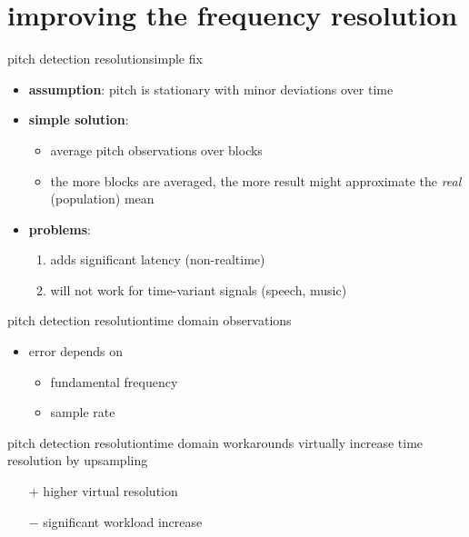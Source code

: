     \section[solutions]{improving the frequency resolution}
        \begin{frame}{pitch detection resolution}{simple fix}
            \begin{itemize}
                \item   \textbf{assumption}: pitch is stationary with minor deviations over time
                \bigskip
                \item<2-> \textbf{simple solution}: 
                    \begin{itemize}
                        \item   average pitch observations over blocks
                        \item   the more blocks are averaged, the more result might approximate the \textit{real} (population) mean
                    \end{itemize}
                \bigskip
                \item<3->   \textbf{problems}:
                    \begin{enumerate}
                        \item   adds significant latency (non-realtime)
                        \item   will not work for time-variant signals (speech, music)
                    \end{enumerate}
            \end{itemize}
        \end{frame}
    
        \begin{frame}{pitch detection resolution}{time domain observations}
            
            \begin{itemize}
                \item   error depends on 
								\begin{itemize}
									\item fundamental frequency
									\item   sample rate
								\end{itemize}
            \end{itemize}
        \end{frame}
        \begin{frame}{pitch detection resolution}{time domain workarounds}
            \vspace{-2mm}
            virtually increase time resolution by upsampling
            
            \begin{enumerate}
                \item[$+$] higher virtual resolution
                \item[$-$] significant workload increase
            \end{enumerate}
        \end{frame}
	
